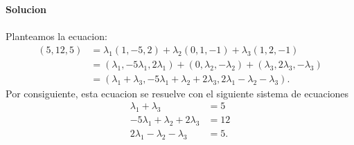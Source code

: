 \documentclass{article}
\theoremstyle{definition}
\theoremstyle{definition}
\theoremstyle{remark}
\begin{document}
\textbf{Solucion}\\\\
Planteamos la ecuacion: \[
  \begin{aligned}
    (5,12,5) &= \lambda_{1}(1,-5,2)+\lambda_{2}(0,1,-1)+\lambda_{3}(1,2,-1) \\
             &= (\lambda_{1},-5\lambda_{1},2 \lambda_{1})+(0,\lambda_2,-\lambda_2)+(\lambda_{3},2\lambda_3,-\lambda_3) \\
             &= (\lambda_1 + \lambda_3 , -5\lambda_1+\lambda_2+2\lambda_3,2\lambda_1 - \lambda_2 -  \lambda_3).
  \end{aligned}
\]
  Por consiguiente, esta ecuacion se resuelve con el siguiente sistema de ecuaciones \[
    \begin{aligned}
      \lambda_1 +\lambda_3 &= 5 \\
      -5\lambda_1 + \lambda_2 + 2\lambda_3 &= 12 \\
      2 \lambda_1 - \lambda_2 - \lambda_3 &= 5.
    \end{aligned}
  \]
  \pagebreak
\end{document}
